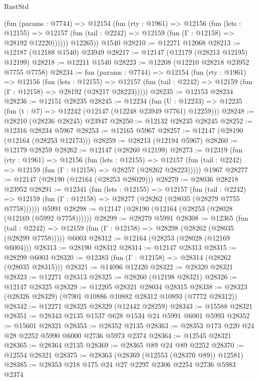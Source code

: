 \begin{lexlean}{RustStd}
\begin{coremodule}
          (fun (params : @7744) =>
          @12154
            (fun (rty : @1961) =>
            @12156
              (fun (lets : @12155) =>
              @12157 (fun (tail : @2242) => @12159 (fun (Γ : @12158) => @28192 @12220))))))
        @12265))
    @1540
@28210 := @12271 @12068
@28213 := @12187 (@12188 @1540) @23949
@28217 := @12147 (@12179 (@28213 @12195) @12199)
@28218 := @12211 @1540
@28223 := @12208 (@12210 @28218 @23952 @7755 @7758)
@28234 := fun (params : @7744) =>
  @12154
    (fun (rty : @1961) =>
    @12156
      (fun (lets : @12155) =>
      @12157 (fun (tail : @2242) => @12159 (fun (Γ : @12158) => @28192 (@28217 @28223)))))
@28235 := @12153 @28234
@28236 := @12151 @28235
@28245 := @12234
    (fun (U : @12233) => @12235 (fun (t : @7) => @12242 (@12147 (@12248 @23949 @7761) @12259)))
@28248 := @28210 (@28236 @28245) @23947
@28250 := @12132 @28235 @28245
@28252 := @12316 @28234 @5967
@28253 := @12165 @5967
@28257 := @12147 (@28190 (@12164 (@28253 @12173)))
@28259 := @28213 (@12194 @5967)
@28260 := @12179 @28259
@28262 := @12147 (@28260 @12199)
@28273 := @12319
    (fun (rty : @1961) =>
    @12156
      (fun (lets : @12155) =>
      @12157 (fun (tail : @2242) => @12159 (fun (Γ : @12158) => @28257 (@28262 @28223)))))
    @1967
@28277 := @12147 (@28190 (@12164 (@28253 @28029)))
@28279 := @28036 @28218 @23952
@28291 := @12341
    (fun (lets : @12155) =>
    @12157
      (fun (tail : @2242) =>
      @12159 (fun (Γ : @12158) => @28277 (@28262 (@28035 (@28279 @7755 @7758))))))
    @5991
@28298 := @12147 (@28190 (@12164 (@28253 (@28028 (@12169 (@5992 @7758))))))
@28299 := @28279 @5991
@28308 := @12365
    (fun (tail : @2242) => @12159 (fun (Γ : @12158) => @28298 (@28262 (@28035 (@28299 @7758)))))
    @6003
@28312 := @12164 (@28253 (@28028 (@12169 @6004)))
@28313 := @28190 @28312
@28314 := @12147 @28313
@28315 := @28299 @6003
@28320 := @12383 (fun (Γ : @12158) => @28314 (@28262 (@28035 @28315)))
@28321 := @14096 @12420
@28322 := @28320 @28321
@28323 := @12271 @28313
@28325 := @28260 (@12198 @28321)
@28326 := @12147 @28325
@28329 := @12205 @28321 @28034 @28315
@28338 := @28323 (@28326 @28329) (@7901 @10886 @10882 @28312 @10893 (@7772 @28312))
@28342 := @12271 @28325 @28329 (@12442 @28259)
@28343 := @15588 @28321
@28351 := @28343 @2135 @1537 @628 @1534 @24 @5991 @6001 @5993
@28352 := @15601 @28321
@28353 := @28352 @2135
@28363 := @28353 @173 @220 @24 @28 @2252 @5990 @6000 @2736 @5973 @2374
@28364 := @12545 @28321
@28365 := @28364 @2135
@28369 := @28365 @89 @24 @89 @2252
@28370 := @12554 @28321
@28375 := @28363 (@28369 (@12553 (@28370 @89)) @12581)
@28385 := @28353 @218 @175 @24 @27 @2297 @2306 @2254 @2736 @5983 @2374

\end{coremodule}
\end{lexlean}
